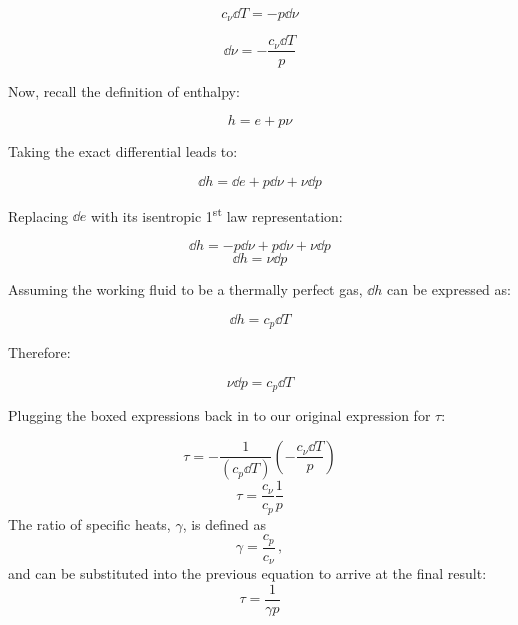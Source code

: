 \documentclass[12pt,letterpaper]{article}
\begin{document}
\begin{enumerate}[label=(\alph*)]
\begin{enumerate}[label=\arabic*.]
					\begin{equation*}
						c_\nu \dd T= -p \dd \nu
					\end{equation*}
					
					\begin{equation*}
						\boxed{\dd \nu = - \frac{c_{\nu}\dd T}{p}}
					\end{equation*}				
				
					Now, recall the definition of enthalpy:
					
					\begin{equation*}
						h = e + p\nu
					\end{equation*}
					
					Taking the exact differential leads to:
					
					\begin{equation*}
						\dd h = \dd e + p\dd \nu + \nu \dd p
					\end{equation*}
					
					Replacing $\dd e$ with its isentropic 1\textsuperscript{st} law representation:
						
					\begin{equation*}
						\dd h = -p\dd \nu + p\dd\nu + \nu \dd p
					\end{equation*}
					\begin{equation*}
						\dd h = \nu \dd p
					\end{equation*}
				
					Assuming the working fluid to be a thermally perfect gas, $\dd h$ can be expressed as:
					
					\begin{equation*}
						\dd h = c_p \dd T
					\end{equation*}
					
					Therefore:
					
					\begin{equation*}
						\boxed{\nu \dd p = c_p \dd T}
					\end{equation*}
				
				
					Plugging the boxed expressions back in to our original expression for $\tau$: 
					
					\begin{equation*}
						\tau = - \frac{1}{\left(c_{p}\dd T\right)} \left(-\frac{c_{\nu}\dd T}{p}\right)
					\end{equation*}
					\begin{equation*}
						\tau = \frac{c_{\nu}}{c_p}\frac{1}{p}
					\end{equation*}
					The ratio of specific heats, $\gamma$, is defined as
					\begin{equation*}
						\gamma = \frac{c_p}{c_{\nu}}\,,
					\end{equation*}
					and can be substituted into the previous equation to arrive at the final result:
					\begin{equation*}
						\boxed{\tau = \frac{1}{\gamma p}}
					\end{equation*}


\end{enumerate}
\end{enumerate}
\end{document}
